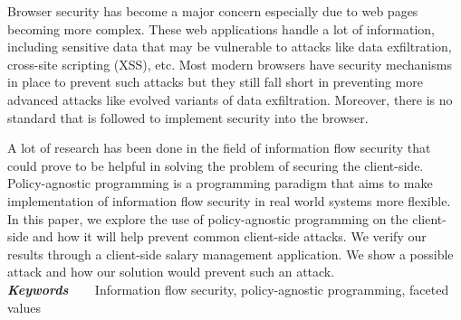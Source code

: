 \providecommand{\keywords}[1]{\textbf{\textit{Keywords~~~}} #1}

Browser security has become a major concern especially due to web pages becoming
more complex. These web applications handle a lot of information, including
sensitive data that may be vulnerable to attacks like data exfiltration,
cross-site scripting (XSS), etc. Most modern browsers have security mechanisms in
place to prevent such attacks but they still fall short in preventing more advanced
attacks like evolved variants of data exfiltration. Moreover, there is no standard
that is followed to implement security into the browser.
\par A lot of research has been done in the field of information flow security
that could prove to be helpful in solving the problem of securing the client-side.
Policy-agnostic programming is a programming paradigm that aims to make implementation
of information flow security in real world systems more flexible. In this paper,
we explore the use of policy-agnostic programming on the client-side and how it
will help prevent common client-side attacks. We verify our results through a
client-side salary management application. We show a possible attack and how
our solution would prevent such an attack.\\
\keywords{Information flow security, policy-agnostic programming, faceted values}
